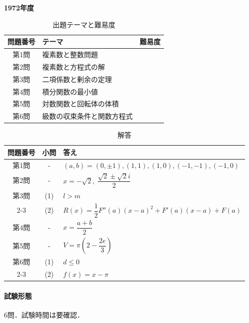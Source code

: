\documentclass[../../main.tex]{subfiles}
\begin{document}
\begin{center}
  {\fontsize{48pt}{58pt}\selectfont \textbf{1972}\normalsize\textbf{年度}}
\end{center}

\begin{table}[htb]
  \centering
  \caption{出題テーマと難易度}
  \begin{tabular}{|c|p{9cm}|c|}
    \hline
    \textbf{問題番号} & \textbf{テーマ} & \textbf{難易度} \\
    \hline
    第1問 & 複素数と整数問題 & \\
    \hline
    第2問 & 複素数と方程式の解 & \\
    \hline
    第3問 & 二項係数と剰余の定理 & \\
    \hline
    第4問 & 積分関数の最小値 & \\
    \hline
    第5問 & 対数関数と回転体の体積 & \\
    \hline
    第6問 & 級数の収束条件と関数方程式 & \\
    \hline
  \end{tabular}
\end{table}

\begin{table}[htb]
  \centering
  \caption{解答}
  \renewcommand{\arraystretch}{1.4}
  \begin{tabular}{|c|c|p{9cm}|}
    \hline
    \textbf{問題番号} & \textbf{小問} & \textbf{答え} \\
    \hline
    第1問 & - & $(a,b)=(0,\pm1),(1,1),(1,0),(-1,-1),(-1,0)$ \\
    \hline
    第2問 & - & $x=-\sqrt{2},\ \dfrac{\sqrt{2}\pm\sqrt{2}i}{2}$ \\
    \hline
    第3問 & (1) & $l>m$ \\
    \cline{2-3}
    & (2) & $R(x)=\dfrac{1}{2}F''(a)(x-a)^2+F'(a)(x-a)+F(a)$ \\
    \hline
    第4問 & - & $x=\dfrac{a+b}{2}$ \\
    \hline
    第5問 & - & $V=\pi\left(2-\dfrac{2e}{3}\right)$ \\
    \hline
    第6問 & (1) & $d\le0$ \\
    \cline{2-3}
    & (2) & $f(x)=x-\pi$ \\
    \hline
  \end{tabular}
\end{table}

\paragraph{試験形態}
6問．試験時間は要確認．
\end{document}
